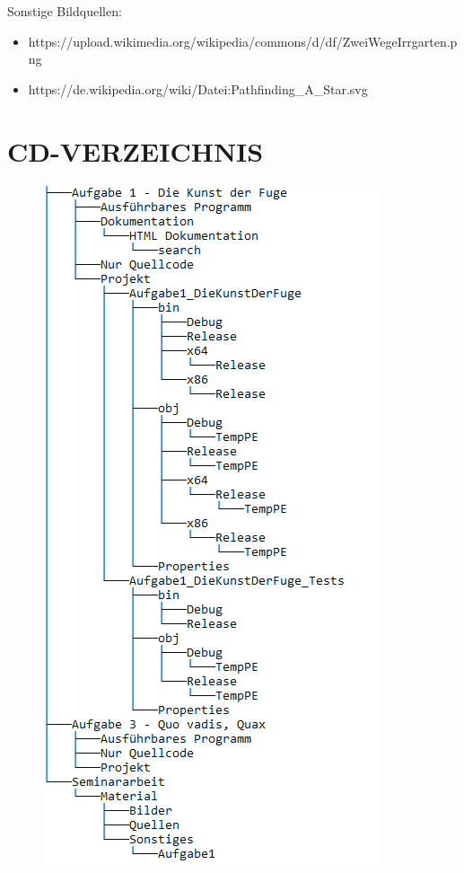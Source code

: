 \documentclass[a4paper,12pt]{article}
\begin{document}
Sonstige Bildquellen:
\begin{itemize}
\item https://upload.wikimedia.org/wikipedia/commons/d/df/ZweiWegeIrrgarten.png
\item https://de.wikipedia.org/wiki/Datei:Pathfinding\_A\_Star.svg
\end{itemize}


\newpage
\section{CD-VERZEICHNIS}

\begin{figure}[H]
    \includegraphics[width=.7\linewidth]{Bilder/Sonstiges/CDVerzeichnis.png}
\end{figure}
\end{document}
